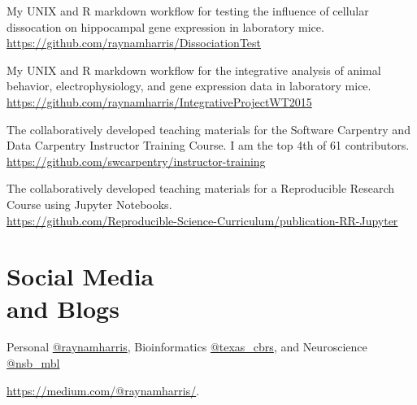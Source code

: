 \documentclass[margin,line]{resume}
\begin{document}
\begin{resume}
\begin{description}
\setlength{\itemsep}{3pt}
\item [\href{https://github.com/raynamharris/DissociationTest}{DissociationTest}] My UNIX and R markdown workflow for testing the influence of cellular dissocation on hippocampal gene expression in laboratory mice.\\  \url{https://github.com/raynamharris/DissociationTest}
\item [\href{https://github.com/raynamharris/IntegrativeProjectWT2015}{IntegrativeProjectWT2015}] My UNIX and R markdown workflow for the integrative analysis of animal behavior, electrophysiology, and gene expression data in laboratory mice. \\ \url{https://github.com/raynamharris/IntegrativeProjectWT2015}
\item [\href{https://github.com/swcarpentry/instructor-training}{instructor-training}] The collaboratively developed teaching materials for the Software Carpentry and Data Carpentry Instructor Training Course. I am the top 4th of 61 contributors. \\ \url{https://github.com/swcarpentry/instructor-training}
\item [\href{https://github.com/Reproducible-Science-Curriculum/publication-RR-Jupyter}{publication-RR-Jupyter}] The collaboratively developed teaching materials for a Reproducible Research Course using Jupyter Notebooks.\\ \url{https://github.com/Reproducible-Science-Curriculum/publication-RR-Jupyter}

\end{description}


\section{\mysidestyle Social Media\\and Blogs}

\begin{description}{}{
\setlength{\leftmargin}{1cm}%
\setlength{\itemindent}{-1cm}
}
\setlength{\itemsep}{3pt}
\item[Twitter:] Personal \href{http://twitter.com/raynamharris}{@raynamharris}, Bioinformatics \href{http://twitter.com/texas\_cbrs}{@texas\_cbrs}, and Neuroscience \href{http://twitter.com/nsb\_mbl}{@nsb\_mbl} 
\item[Professional/personal blog:]  \url{https://medium.com/@raynamharris/}. %


\end{description}
\end{resume}
\end{document}
